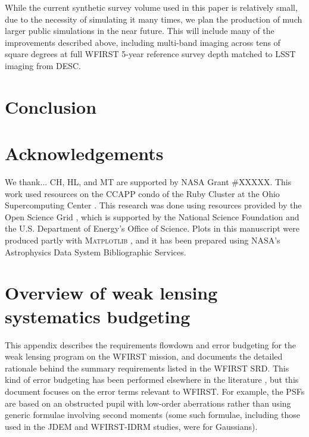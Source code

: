 \documentclass[aps,prd, amsmath,amssymb,superscriptaddress,showkeys,nofootinbib,reprint,preprintnumbers]{revtex4-1}
\begin{document}
While the current synthetic survey volume used in this paper is relatively small, due to the necessity of simulating it many times, we plan the production of much larger public simulations in the near future. This will include many of the improvements described above, including multi-band imaging across tens of square degrees at full WFIRST 5-year reference survey depth matched to LSST imaging from DESC. 

\section{Conclusion}\label{sec:conclusion}



\section*{Acknowledgements}

We thank...
CH, HL, and MT are supported by NASA Grant \#XXXXX.  
This work used resources on the CCAPP condo of the Ruby Cluster at the Ohio Supercomputing Center \cite{OhioSupercomputerCenter1987}. This research was done using resources provided by the Open Science Grid \cite{Pordes2008,Sfiligoi2009}, which is supported by the National Science Foundation and the U.S. Department of Energy's Office of Science. Plots in this manuscript were produced partly with \textsc{Matplotlib} \cite{Hunter:2007}, and it has been prepared using NASA's Astrophysics Data System Bibliographic Services.

\appendix


\section{Overview of weak lensing systematics budgeting}
\label{app:wl-budget}

This appendix describes the requirements flowdown and error budgeting
for the weak lensing program on the WFIRST mission, and documents the
detailed rationale behind the summary requirements listed in the
WFIRST SRD. This kind of error budgeting has been performed elsewhere
in the literature \cite{2008A&A...484...67P,2013MNRAS.429..661M}, but
this document focuses on the error terms relevant to WFIRST. For
example, the PSFs are based on an obstructed pupil with low-order
aberrations rather than using generic formulae involving second
moments (some such formulae, including those used in the JDEM and
WFIRST-IDRM studies, were for Gaussians).
\end{document}
